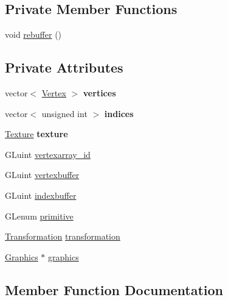 \subsection*{Private Member Functions}
\begin{DoxyCompactItemize}
\item 
void \mbox{\hyperlink{classagl_1_1Buffer_a71a6b0eb942d6eadaf949d538c50aa91}{rebuffer}} ()
\end{DoxyCompactItemize}
\subsection*{Private Attributes}
\begin{DoxyCompactItemize}
\item 
\mbox{\label{classagl_1_1Buffer_a6b738fb080cb78f9b46af8f60d3936c8}} 
vector$<$ \mbox{\hyperlink{classagl_1_1Vertex}{Vertex}} $>$ {\bfseries vertices}
\item 
\mbox{\label{classagl_1_1Buffer_ad3859594ff238dfa4af2ba5ca4d2e86f}} 
vector$<$ unsigned int $>$ {\bfseries indices}
\item 
\mbox{\label{classagl_1_1Buffer_a353f38da8d41eaebe2dce8a28c3bb2a5}} 
\mbox{\hyperlink{classagl_1_1Texture}{Texture}} {\bfseries texture}
\item 
G\+Luint \mbox{\hyperlink{classagl_1_1Buffer_a957aca2a128e4b512eb858cdea749da1}{vertexarray\+\_\+id}}
\item 
G\+Luint \mbox{\hyperlink{classagl_1_1Buffer_a634615ef5cf03ede6e3afe31a6fc5723}{vertexbuffer}}
\item 
G\+Luint \mbox{\hyperlink{classagl_1_1Buffer_a6a3afd93e5f0f3c7aa2ba163537ad6fc}{indexbuffer}}
\item 
G\+Lenum \mbox{\hyperlink{classagl_1_1Buffer_a58c9e34d415980f2e19b8774ddac22dc}{primitive}}
\item 
\mbox{\hyperlink{classagl_1_1Transformation}{Transformation}} \mbox{\hyperlink{classagl_1_1Buffer_a958d8a9c8719b13f7aa2efb0879bf962}{transformation}}
\item 
\mbox{\hyperlink{classagl_1_1Graphics}{Graphics}} $\ast$ \mbox{\hyperlink{classagl_1_1Buffer_a51cbbfb12ba689de4aea001b0f4242c1}{graphics}}
\end{DoxyCompactItemize}


\subsection{Member Function Documentation}
\mbox{\label{classagl_1_1Buffer_ae1d1a6b36fc4d53385c0a58db550603a}} 

